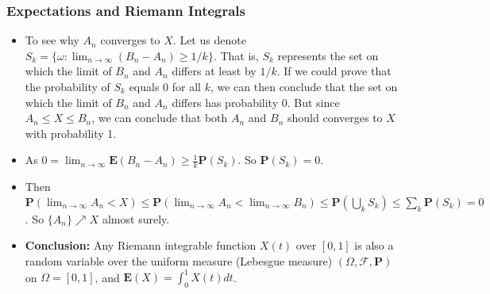 \documentclass[handout]{beamer}
\newcommand{\BP}{\mathbf{P}}
\newcommand{\BE}{\mathbf{E}}
\begin{document}
\frame
{
  \frametitle{Expectations and Riemann Integrals}

   \begin{itemize}

\item<1-> To see why $A_n$ converges to $X$. Let us denote $S_k=\{\omega: \lim_{n\rightarrow \infty} (B_n-A_n) \ge 1/k\}$. That is, $S_k$ represents the set on which the limit of $B_n$ and $A_n$ differs at least by $1/k$. If we could prove that the probability of $S_k$ equals 0 for all $k$, we can then conclude that the set on which the limit of $B_n$ and $A_n$ differs has probability 0. But since $A_n\leq X\leq B_n$, we can conclude that both $A_n$ and $B_n$ should converges to $X$ with probability 1. 
    
         
\item<2-> As $0=\lim_{n\rightarrow \infty} \BE(B_n-A_n) \geq \frac{1}{k}\BP(S_k)$. So $\BP(S_k)=0$. 
   
      \item<3-> Then $\BP(\lim_{n\rightarrow \infty} A_n< X) \leq \BP(\lim_{n\rightarrow \infty} A_n< \lim_{n\rightarrow \infty} B_n ) \leq \BP(\bigcup_k S_k) \leq \sum_k\BP(S_k)=0$. So $\{A_n\} \nearrow X$ almost surely.
         
         
            
      \item<4-> \textbf{Conclusion:}   Any Riemann integrable function $X(t)$ over $[0,1]$ is also a random variable over the uniform measure (Lebesgue measure) $(\Omega, \mathcal{F}, \BP)$ on $\Omega=[0,1]$, and $\BE(X)=\int_{0}^1 X(t) dt$.        


\end{itemize}
}
\end{document}
